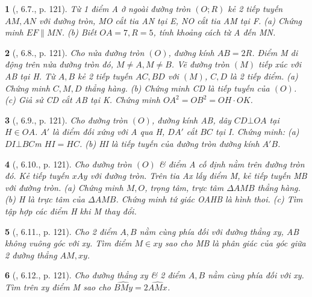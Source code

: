 \documentclass{article}
\newtheorem{baitoan}{}
\begin{document}
\begin{baitoan}[\cite{Binh_boi_duong_Toan_9_tap_1}, 6.7., p. 121]
	Từ 1 điểm A ở ngoài đường tròn $(O;R)$ kẻ 2 tiếp tuyến $AM,AN$ với đường tròn, MO cắt tia AN tại E, NO cắt tia AM tại F. (a) Chứng minh $EF\parallel MN$. (b) Biết $OA = 7,R = 5$, tính khoảng cách từ A đến MN.
\end{baitoan}

\begin{baitoan}[\cite{Binh_boi_duong_Toan_9_tap_1}, 6.8., p. 121]
	Cho nửa đường tròn $(O)$, đường kính $AB = 2R$. Điểm M di động trên nửa đường tròn đó, $M\ne A,M\ne B$. Vẽ đường tròn $(M)$ tiếp xúc với AB tại H. Từ $A,B$ kẻ 2 tiếp tuyến $AC,BD$ với $(M)$, $C,D$ là 2 tiếp điểm. (a) Chứng minh $C,M,D$ thẳng hàng. (b) Chứng minh CD là tiếp tuyến của $(O)$. (c) Giả sử CD cắt AB tại K. Chứng minh $OA^2 = OB^2 = OH\cdot OK$.
\end{baitoan}

\begin{baitoan}[\cite{Binh_boi_duong_Toan_9_tap_1}, 6.9., p. 121]
	Cho đường tròn $(O)$, đường kính AB, dây $CD\bot OA$ tại $H\in OA$. $A'$ là điểm đối xứng với A qua H, $DA'$ cắt $BC$ tại I. Chứng minh: (a) $DI\bot BC$m $HI = HC$. (b) HI là tiếp tuyến của đường tròn đường kính $A'B$.
\end{baitoan}

\begin{baitoan}[\cite{Binh_boi_duong_Toan_9_tap_1}, 6.10., p. 121]
	Cho đường tròn $(O)$ \& điểm A cố định nằm trên đường tròn đó. Kẻ tiếp tuyến $xAy$ với đường tròn. Trên tia Ax lấy điểm M, kẻ tiếp tuyến MB với đường tròn. (a) Chứng minh $M,O$, trọng tâm, trực tâm $\Delta AMB$ thẳng hàng. (b) H là trực tâm của $\Delta AMB$. Chứng minh tứ giác OAHB là hình thoi. (c) Tìm tập hợp các điểm H khi M thay đổi.
\end{baitoan}

\begin{baitoan}[\cite{Binh_boi_duong_Toan_9_tap_1}, 6.11., p. 121]
	Cho 2 điểm $A,B$ nằm cùng phía đối với đường thẳng xy, AB không vuông góc với xy. Tìm điểm $M\in xy$ sao cho MB là phân giác của góc giữa 2 đường thẳng $AM,xy$.
\end{baitoan}

\begin{baitoan}[\cite{Binh_boi_duong_Toan_9_tap_1}, 6.12., p. 121]
	Cho đường thẳng xy \& 2 điểm $A,B$ nằm cùng phía đối với xy. Tìm trên xy điểm M sao cho $\widehat{BMy} = 2\widehat{AMx}$.
\end{baitoan}
\end{document}

